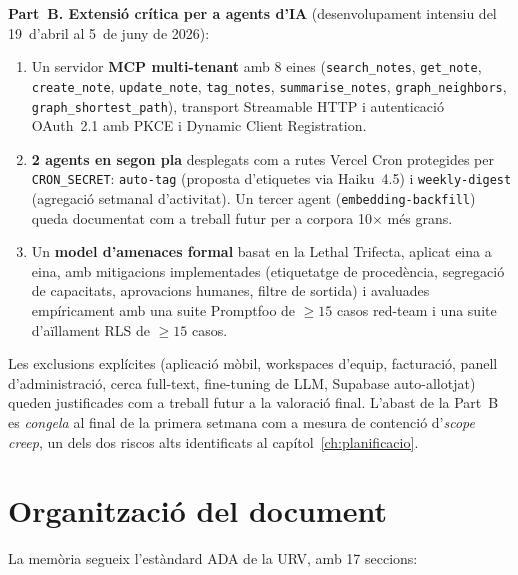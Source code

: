 \textbf{Part~B. Extensió crítica per a agents d'IA} (desenvolupament
intensiu del 19~d'abril al 5~de juny de 2026):

\begin{enumerate}
  \item Un servidor \textbf{MCP multi-tenant} amb 8 eines
    (\texttt{search\_notes}, \texttt{get\_note}, \texttt{create\_note},
    \texttt{update\_note}, \texttt{tag\_notes},
    \texttt{summarise\_notes}, \texttt{graph\_neighbors},
    \texttt{graph\_shortest\_path}), transport Streamable HTTP i
    autenticació OAuth~2.1 amb PKCE i Dynamic Client Registration.

  \item \textbf{2 agents en segon pla} desplegats com a rutes
    Vercel Cron protegides per \texttt{CRON\_SECRET}:
    \texttt{auto-tag} (proposta d'etiquetes via Haiku~4.5) i
    \texttt{weekly-digest} (agregació setmanal d'activitat). Un
    tercer agent (\texttt{embedding-backfill}) queda documentat com
    a treball futur per a corpora 10$\times$ més grans.

  \item Un \textbf{model d'amenaces formal} basat en la Lethal
    Trifecta, aplicat eina a eina, amb mitigacions implementades
    (etiquetatge de procedència, segregació de capacitats,
    aprovacions humanes, filtre de sortida) i avaluades empíricament
    amb una suite Promptfoo de $\geq 15$ casos red-team i una suite
    d'aïllament RLS de $\geq 15$ casos.
\end{enumerate}

Les exclusions explícites (aplicació mòbil, workspaces d'equip,
facturació, panell d'administració, cerca full-text, fine-tuning de LLM,
Supabase auto-allotjat) queden justificades com a treball futur a la
valoració final. L'abast de la Part~B es \emph{congela} al final de la
primera setmana com a mesura de contenció d'\emph{scope creep}, un dels
dos riscos alts identificats al capítol~\ref{ch:planificacio}.

\section{Organització del document}
\label{sec:organitzacio}

La memòria segueix l'estàndard ADA de la URV, amb 17 seccions:


